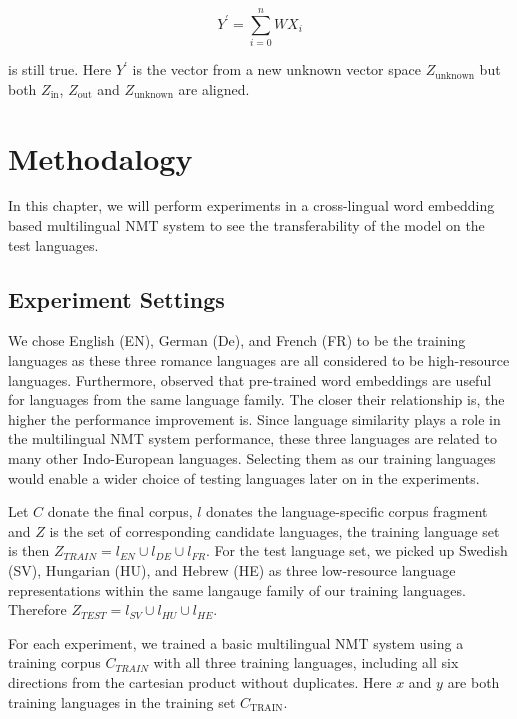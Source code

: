 \documentclass[thesis,fonts=libertine]{cluu}
\begin{document}
\begin{equation*}
  Y^\prime = \sum_{i=0}^n WX_i
\end{equation*}

\noindent is still true. Here $Y^\prime$ is the vector from a new unknown vector space $Z_\text{unknown}$ but both $Z_\text{in}$, $Z_\text{out}$ and $Z_\text{unknown}$ are aligned.

\chapter{Methodalogy}
\label{chap:method}

In this chapter, we will perform experiments in a cross-lingual word embedding based multilingual NMT system to see the transferability of the model on the test languages.

\section{Experiment Settings}
\label{sec:initial_exp_settings}

We chose English (EN), German (De), and French (FR) to be the training languages as these three romance languages are all considered to be high-resource languages. Furthermore, \textcite{Qi:2018aa} observed that pre-trained word embeddings are useful for languages from the same language family. The closer their relationship is, the higher the performance improvement is. Since language similarity plays a role in the multilingual NMT system performance, these three languages are related to many other Indo-European languages. Selecting them as our training languages would enable a wider choice of testing languages later on in the experiments.

Let $C$ donate the final corpus, $l$ donates the language-specific corpus fragment and $Z$ is the set of corresponding candidate languages, the training language set is then $Z_{TRAIN} = {l_{EN}\cup l_{DE}\cup l_{FR}}$. For the test language set, we picked up Swedish (SV), Hungarian (HU), and Hebrew (HE) as three low-resource language representations within the same langauge family of our training languages. Therefore $Z_{TEST} = {l_{SV}\cup l_{HU}\cup l_{HE}}$.

For each experiment, we trained a basic multilingual NMT system using a training corpus $C_{TRAIN}$ with all three training languages, including all six directions from the cartesian product without duplicates. Here $x$ and $y$ are both training languages in the training set $C_{\text{TRAIN}}$.
\end{document}
